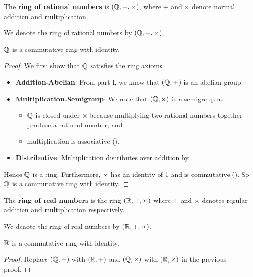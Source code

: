 \begin{definition}
    The \textbf{ring of rational numbers} is $(\mathbb{Q}, +, \times)$, where $+$ and $\times$ denote normal addition and multiplication.
\end{definition}
\begin{remark}
    We denote the ring of rational numbers by $(\mathbb{Q}, +, \times)$.
\end{remark}
\begin{proposition}
    $\mathbb{Q}$ is a commutative ring with identity.
\end{proposition}
\begin{proof}
    We first show that $\mathbb{Q}$ satisfies the ring axioms.
    \begin{itemize}
        \item \textbf{Addition-Abelian}: From part I, we know that $(\mathbb{Q}, +)$ is an abelian group.  %
        \item \textbf{Multiplication-Semigroup}: We note that $(\mathbb{Q}, \times)$ is a semigroup as
        \begin{itemize}
            \item $\mathbb{Q}$ is closed under $\times$ because multiplying two rational numbers together produce a rational number; and
            \item multiplication is associative ().
        \end{itemize}
        \item \textbf{Distributive}: Multiplication distributes over addition by .
    \end{itemize}
    Hence $\mathbb{Q}$ is a ring. Furthermore, $\times$ has an identity of 1 and is commutative (). So $\mathbb{Q}$ is a commutative ring with identity.
\end{proof}

\begin{definition}
    The \textbf{ring of real numbers} is the ring $(\mathbb{R}, +, \times)$ where $+$ and $\times$ denotes regular addition and multiplication respectively.
\end{definition}
\begin{remark}
    We denote the ring of real numbers by $(\mathbb{R}, +, \times)$.
\end{remark}
\begin{proposition}
    $\mathbb{R}$ is a commutative ring with identity.
\end{proposition}
\begin{proof}
    Replace $(\mathbb{Q}, +)$ with $(\mathbb{R}, +)$ and $(\mathbb{Q}, \times)$ with $(\mathbb{R}, \times)$ in the previous proof.
\end{proof}

